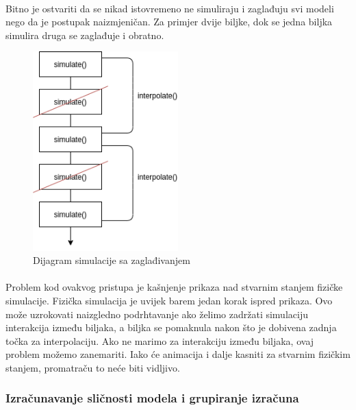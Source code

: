\documentclass[times, utf8, diplomski]{fer}
\begin{document}
\paragraph{}
Bitno je ostvariti da se nikad istovremeno ne simuliraju i zaglađuju svi modeli 
nego da je postupak naizmjeničan. Za primjer dvije biljke, dok se jedna 
biljka simulira druga se zaglađuje i obratno.
\begin{figure}[h]
	\centering
	\includegraphics[width=0.5\textwidth]{img/531-2}
	\caption{Dijagram simulacije sa zaglađivanjem}
	\label{fig:531-2}
\end{figure}
\paragraph{}
Problem kod ovakvog pristupa je kašnjenje prikaza nad stvarnim stanjem fizičke 
simulacije. Fizička simulacija je uvijek barem jedan korak ispred prikaza. Ovo 
može uzrokovati naizgledno podrhtavanje ako želimo zadržati simulaciju 
interakcija između biljaka, a biljka se pomaknula nakon što je dobivena zadnja 
točka za interpolaciju. Ako ne marimo za interakciju između biljaka, ovaj 
problem možemo zanemariti. Iako će animacija i dalje kasniti za stvarnim 
fizičkim stanjem, promatraču to neće biti vidljivo.
\subsubsection{Izračunavanje sličnosti modela i grupiranje izračuna}
\end{document}
